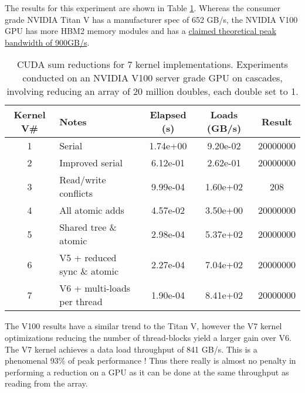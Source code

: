 The results for this experiment are shown in Table \ref{CUDAreductionsPerformanceV100.tab}. Whereas the consumer grade NVIDIA Titan V has a manufacturer spec of 652 GB/s, the NVIDIA V100 GPU has more HBM2 memory modules and has a \href{https://www.nvidia.com/en-us/data-center/tesla-v100/}{claimed theoretical peak bandwidth of 900GB/s}.
\begin{table}[htbp!]
    \centering
    \begin{tabular}{c|l|c|c|c} \hline
    Kernel V\# & Notes & Elapsed (s) & Loads (GB/s) & Result \\ \hline
 1 &  Serial &  1.74e+00 &   9.20e-02 &   20000000 \\ 
2 &  Improved serial & 6.12e-01 &   2.62e-01 &   20000000 \\ 
3 &  Read/write conflicts & 9.99e-04 &   1.60e+02 &   208 \\ 
4 &  All atomic adds &  4.57e-02 &   3.50e+00 &   20000000 \\ 
5 &  Shared tree \& atomic &   2.98e-04 &   5.37e+02 &   20000000 \\ 
6 &  V5 + reduced sync \& atomic & 2.27e-04 &   7.04e+02 &   20000000 \\ 
7 &  V6 + multi-loads per thread & 1.90e-04 &   8.41e+02 &   20000000 \\ 
  \hline
    \end{tabular}
    \caption{CUDA sum reductions for 7 kernel implementations. Experiments conducted on an NVIDIA V100 server grade GPU on cascades, involving reducing an array of 20 million doubles, each double set to 1.}
    \label{CUDAreductionsPerformanceV100.tab}
\end{table}

 The V100 results have a similar trend to the Titan V, however the V7 kernel optimizations reducing the number of thread-blocks yield a larger gain over V6. The V7 kernel achieves a data load throughput of 841 GB/s. This is a phenomenal 93\% of peak performance ! Thus there really is almost no penalty in performing a reduction on a GPU as it can be done at the same throughput as reading from the array.
 
 \printbibliography[heading=subbibliography]